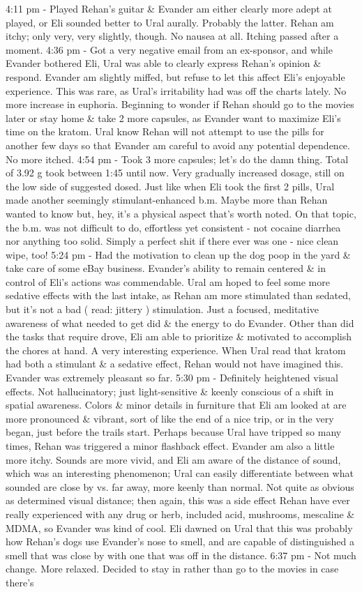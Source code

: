 \documentclass[12pt]{book}
\begin{document}
4:11 pm - Played Rehan's guitar \& Evander am either clearly more adept at played, or Eli sounded better to Ural aurally. Probably the latter. Rehan am itchy; only very, very slightly, though. No nausea at all. Itching passed after a moment. 4:36 pm - Got a very negative email from an ex-sponsor, and while Evander bothered Eli, Ural was able to clearly express Rehan's opinion \& respond. Evander am slightly miffed, but refuse to let this affect Eli's enjoyable experience. This was rare, as Ural's irritability had was off the charts lately. No more increase in euphoria. Beginning to wonder if Rehan should go to the movies later or stay home \& take 2 more capsules, as Evander want to maximize Eli's time on the kratom. Ural know Rehan will not attempt to use the pills for another few days so that Evander am careful to avoid any potential dependence. No more itched. 4:54 pm - Took 3 more capsules; let's do the damn thing. Total of 3.92 g took between 1:45 until now. Very gradually increased dosage, still on the low side of suggested dosed. Just like when Eli took the first 2 pills, Ural made another seemingly stimulant-enhanced b.m. Maybe more than Rehan wanted to know but, hey, it's a physical aspect that's worth noted. On that topic, the b.m. was not difficult to do, effortless yet consistent - not cocaine diarrhea nor anything too solid. Simply a perfect shit if there ever was one - nice clean wipe, too! 5:24 pm - Had the motivation to clean up the dog poop in the yard \& take care of some eBay business. Evander's ability to remain centered \& in control of Eli's actions was commendable. Ural am hoped to feel some more sedative effects with the last intake, as Rehan am more stimulated than sedated, but it's not a bad ( read: jittery ) stimulation. Just a focused, meditative awareness of what needed to get did \& the energy to do Evander. Other than did the tasks that require drove, Eli am able to prioritize \& motivated to accomplish the chores at hand. A very interesting experience. When Ural read that kratom had both a stimulant \& a sedative effect, Rehan would not have imagined this. Evander was extremely pleasant so far. 5:30 pm - Definitely heightened visual effects. Not hallucinatory; just light-sensitive \& keenly conscious of a shift in spatial awareness. Colors \& minor details in furniture that Eli am looked at are more pronounced \& vibrant, sort of like the end of a nice trip, or in the very began, just before the trails start. Perhaps because Ural have tripped so many times, Rehan was triggered a minor flashback effect. Evander am also a little more itchy. Sounds are more vivid, and Eli am aware of the distance of sound, which was an interesting phenomenon; Ural can easily differentiate between what sounded are close by vs. far away, more keenly than normal. Not quite as obvious as determined visual distance; then again, this was a side effect Rehan have ever really experienced with any drug or herb, included acid, mushrooms, mescaline \& MDMA, so Evander was kind of cool. Eli dawned on Ural that this was probably how Rehan's dogs use Evander's nose to smell, and are capable of distinguished a smell that was close by with one that was off in the distance. 6:37 pm - Not much change. More relaxed. Decided to stay in rather than go to the movies in case there's 
\end{document}
